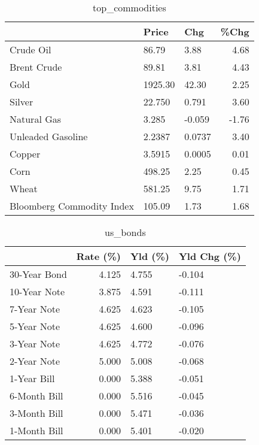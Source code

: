 \documentclass{article}%
\begin{document}
\begin{table}[htbp]%
\caption{top\_commodities}%
\centering%
\begin{adjustbox}{width=1\textwidth}%
\begin{tabular}{lllr}
\toprule
                          &   Price &    Chg &  \%Chg \\
\midrule
               Crude Oil  &   86.79 &   3.88 &  4.68 \\
             Brent Crude  &   89.81 &   3.81 &  4.43 \\
                    Gold  & 1925.30 &  42.30 &  2.25 \\
                  Silver  &  22.750 &  0.791 &  3.60 \\
             Natural Gas  &   3.285 & -0.059 & -1.76 \\
       Unleaded Gasoline  &  2.2387 & 0.0737 &  3.40 \\
                  Copper  &  3.5915 & 0.0005 &  0.01 \\
                    Corn  &  498.25 &   2.25 &  0.45 \\
                   Wheat  &  581.25 &   9.75 &  1.71 \\
Bloomberg Commodity Index &  105.09 &   1.73 &  1.68 \\
\bottomrule
\end{tabular}
%
\end{adjustbox}%
\end{table}

%


\begin{table}[htbp]%
\caption{us\_bonds}%
\centering%
\begin{adjustbox}{width=1\textwidth}%
\begin{tabular}{lrll}
\toprule
             &  Rate (\%) & Yld (\%) & Yld Chg (\%) \\
\midrule
30-Year Bond &     4.125 &   4.755 &      -0.104 \\
10-Year Note &     3.875 &   4.591 &      -0.111 \\
 7-Year Note &     4.625 &   4.623 &      -0.105 \\
 5-Year Note &     4.625 &   4.600 &      -0.096 \\
 3-Year Note &     4.625 &   4.772 &      -0.076 \\
 2-Year Note &     5.000 &   5.008 &      -0.068 \\
 1-Year Bill &     0.000 &   5.388 &      -0.051 \\
6-Month Bill &     0.000 &   5.516 &      -0.045 \\
3-Month Bill &     0.000 &   5.471 &      -0.036 \\
1-Month Bill &     0.000 &   5.401 &      -0.020 \\
\bottomrule
\end{tabular}
%
\end{adjustbox}%
\end{table}
\end{document}
